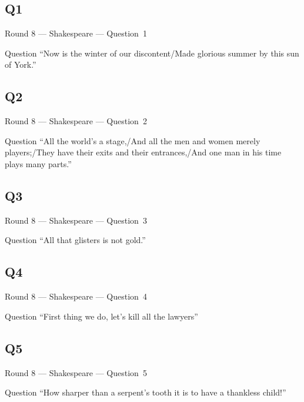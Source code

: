 \documentclass[11pt]{beamer}
\begin{document}
\subsection*{Q1}
\begin{frame}[t]{Round 8 --- Shakespeare --- \mbox{Question 1}}
\vspace{-0.5em}
\begin{block}{Question}
``Now is the winter of our discontent/Made glorious summer by this sun of York.''
\end{block}
\end{frame}
\subsection*{Q2}
\begin{frame}[t]{Round 8 --- Shakespeare --- \mbox{Question 2}}
\vspace{-0.5em}
\begin{block}{Question}
``All the world's a stage,/And all the men and women merely players;/They have their exits and their entrances,/And one man in his time plays many parts.''
\end{block}
\end{frame}
\subsection*{Q3}
\begin{frame}[t]{Round 8 --- Shakespeare --- \mbox{Question 3}}
\vspace{-0.5em}
\begin{block}{Question}
``All that glisters is not gold.''
\end{block}
\end{frame}
\subsection*{Q4}
\begin{frame}[t]{Round 8 --- Shakespeare --- \mbox{Question 4}}
\vspace{-0.5em}
\begin{block}{Question}
``First thing we do, let's kill all the lawyers''
\end{block}
\end{frame}
\subsection*{Q5}
\begin{frame}[t]{Round 8 --- Shakespeare --- \mbox{Question 5}}
\vspace{-0.5em}
\begin{block}{Question}
``How sharper than a serpent's tooth it is to have a thankless child!''
\end{block}
\end{frame}
\end{document}
